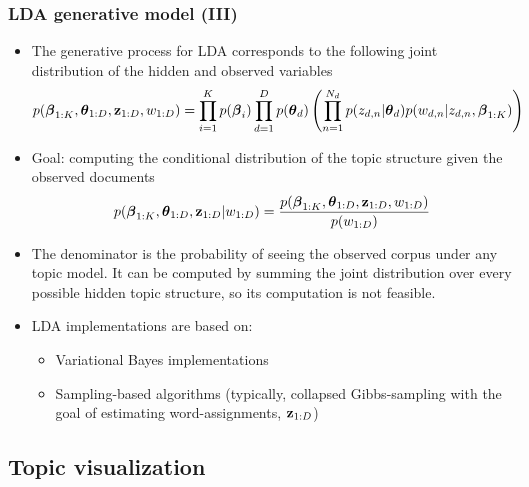 \documentclass{beamer}
\begin{document}
\begin{frame}

    \frametitle{LDA generative model (III)}

	\small
	\begin{itemize}
	\item The generative process for LDA corresponds to the following joint distribution of the hidden and observed variables
	\footnotesize
	$$p({\boldsymbol{\beta}}_{1:K}, {\boldsymbol{\theta}}_{1:D}, {\bf z}_{1:D}, w_{1:D}) = \prod_{i=1}^K p({\boldsymbol{\beta}}_i) \prod_{d=1}^D p({\boldsymbol{\theta}}_d) \left( \prod_{n=1}^{N_d} p({z}_{d,n}|{\boldsymbol{\theta}}_d) p({w}_{d,n} | {z}_{d,n}, {\boldsymbol{\beta}}_{1:K}) \right)$$
	

	\small
	\item Goal: computing the conditional distribution of the topic structure given the observed documents
	\footnotesize
	$$p({\boldsymbol{\beta}}_{1:K}, {\boldsymbol{\theta}}_{1:D}, {\bf z}_{1:D} | w_{1:D}) = \frac{p({\boldsymbol{\beta}}_{1:K}, {\boldsymbol{\theta}}_{1:D}, {\bf z}_{1:D}, w_{1:D})}{p(w_{1:D})}$$
	\small
	\item The denominator is the probability of seeing the observed corpus under any topic model. It can be computed by summing the joint distribution over every possible hidden topic structure, so its computation is not feasible.
	\item LDA implementations are based on:
	\begin{itemize}
	\item Variational Bayes implementations
	\item Sampling-based algorithms (typically, collapsed Gibbs-sampling with the goal of estimating word-assignments, ${\bf z}_{1:D}$)
	\end{itemize}
	
	\end{itemize}

\end{frame}

\subsection{Topic visualization}
\end{document}
